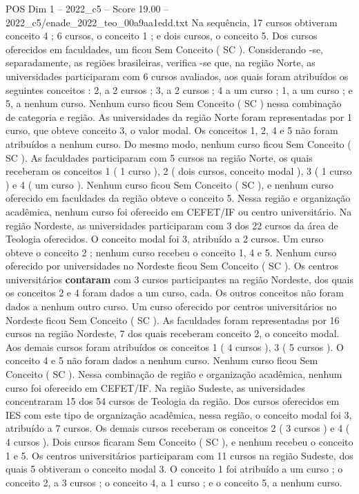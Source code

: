 \begin{textsample}{POS Dim 1 – 2022\_c5 – Score 19.00 – 2022\_c5/enade\_2022\_teo\_00a9aa1edd.txt}
Na sequência, 17 cursos obtiveram conceito 4 ; 6 cursos, o conceito 1 ; e dois cursos, o conceito 5.
Dos cursos oferecidos em faculdades, um ficou Sem Conceito ( SC ).
Considerando -se, separadamente, as regiões brasileiras, verifica -se que, na região Norte, as universidades participaram com 6 cursos avaliados, aos quais foram atribuídos os seguintes conceitos : 2, a 2 cursos ; 3, a 2 cursos ; 4 a um curso ; 1, a um curso ; e 5, a nenhum curso.
Nenhum curso ficou Sem Conceito ( SC ) nessa combinação de categoria e região.
As universidades da região Norte foram representadas por 1 curso, que obteve conceito 3, o valor modal.
Os conceitos 1, 2, 4 e 5 não foram atribuídos a nenhum curso.
Do mesmo modo, nenhum curso ficou Sem Conceito ( SC ).
As faculdades participaram com 5 cursos na região Norte, os quais receberam os conceitos 1 ( 1 curso ), 2 ( dois cursos, conceito modal ), 3 ( 1 curso ) e 4 ( um curso ).
Nenhum curso ficou Sem Conceito ( SC ), e nenhum curso oferecido em faculdades da região obteve o conceito 5.
Nessa região e organização acadêmica, nenhum curso foi oferecido em CEFET/IF ou centro universitário.
Na região Nordeste, as universidades participaram com 3 dos 22 cursos da área de Teologia oferecidos.
O conceito modal foi 3, atribuído a 2 cursos.
Um curso obteve o conceito 2 ; nenhum curso recebeu o conceito 1, 4 e 5.
Nenhum curso oferecido por universidades no Nordeste ficou Sem Conceito ( SC ).
Os centros universitários \textbf{contaram} com 3 cursos participantes na região Nordeste, dos quais os conceitos 2 e 4 foram dados a um curso, cada.
Os outros conceitos não foram dados a nenhum outro curso.
Um curso oferecido por centros universitários no Nordeste ficou Sem Conceito ( SC ).
As faculdades foram representadas por 16 cursos na região Nordeste, 7 dos quais receberam conceito 2, o conceito modal.
Aos demais cursos foram atribuídos os conceitos 1 ( 4 cursos ), 3 ( 5 cursos ).
O conceito 4 e 5 não foram dados a nenhum curso.
Nenhum curso ficou Sem Conceito ( SC ).
Nessa combinação de região e organização acadêmica, nenhum curso foi oferecido em CEFET/IF.
Na região Sudeste, as universidades concentraram 15 dos 54 cursos de Teologia da região.
Dos cursos oferecidos em IES com este tipo de organização acadêmica, nessa região, o conceito modal foi 3, atribuído a 7 cursos.
Os demais cursos receberam os conceitos 2 ( 3 cursos ) e 4 ( 4 cursos ).
Dois cursos ficaram Sem Conceito ( SC ), e nenhum recebeu o conceito 1 e 5.
Os centros universitários participaram com 11 cursos na região Sudeste, dos quais 5 obtiveram o conceito modal 3.
O conceito 1 foi atribuído a um curso ; o conceito 2, a 3 cursos ; o conceito 4, a 1 curso ; e o conceito 5, a nenhum curso.

\end{textsample}
